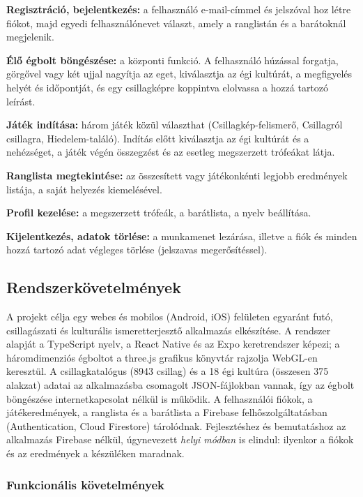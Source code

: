 \documentclass[12pt,a4paper]{article}
\begin{document}
\textbf{Regisztráció, bejelentkezés:} a felhasználó e-mail-címmel és jelszóval hoz létre fiókot,
majd egyedi felhasználónevet választ, amely a ranglistán és a barátoknál megjelenik.

\textbf{Élő égbolt böngészése:} a központi funkció. A felhasználó húzással forgatja, görgővel vagy
két ujjal nagyítja az eget, kiválasztja az égi kultúrát, a megfigyelés helyét és időpontját, és egy
csillagképre koppintva elolvassa a hozzá tartozó leírást.

\textbf{Játék indítása:} három játék közül választhat (Csillagkép-felismerő, Csillagról
csillagra, Hiedelem-találó). Indítás előtt kiválasztja az égi kultúrát és a nehézséget, a
játék végén összegzést és az esetleg megszerzett trófeákat látja.

\textbf{Ranglista megtekintése:} az összesített vagy játékonkénti legjobb eredmények listája,
a saját helyezés kiemelésével.

\textbf{Profil kezelése:} a megszerzett trófeák, a barátlista, a nyelv beállítása.

\textbf{Kijelentkezés, adatok törlése:} a munkamenet lezárása, illetve a fiók és minden
hozzá tartozó adat végleges törlése (jelszavas megerősítéssel).

\subsection{Rendszerkövetelmények}

A projekt célja egy webes és mobilos (Android, iOS) felületen egyaránt futó, csillagászati és
kulturális ismeretterjesztő alkalmazás elkészítése. A rendszer alapját a TypeScript nyelv, a
React Native és az Expo keretrendszer képezi; a háromdimenziós égboltot a three.js grafikus
könyvtár rajzolja WebGL-en keresztül. A csillagkatalógus (8943 csillag) és a 18 égi kultúra
(összesen 375 alakzat) adatai az alkalmazásba csomagolt JSON-fájlokban vannak, így az égbolt
böngészése internetkapcsolat nélkül is működik. A felhasználói fiókok, a játékeredmények, a
ranglista és a barátlista a Firebase felhőszolgáltatásban (Authentication, Cloud Firestore)
tárolódnak. Fejlesztéshez és bemutatáshoz az alkalmazás Firebase nélkül, úgynevezett
\emph{helyi módban} is elindul: ilyenkor a fiókok és az eredmények a készüléken maradnak.

\subsubsection{Funkcionális követelmények}
\end{document}
